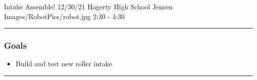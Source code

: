 \insertmeeting 
	{Intake Assemble!} 
	{12/30/21} 
	{Hagerty High School}
	{Jensen}
	{Images/RobotPics/robot.jpg}
	{2:30 - 4:30}
	
\noindent\hfil\rule{\textwidth}{.4pt}\hfil
\subsubsection*{Goals}
\begin{itemize}
    \item Build and test new roller intake

\end{itemize} 

\noindent\hfil\rule{\textwidth}{.4pt}\hfil


